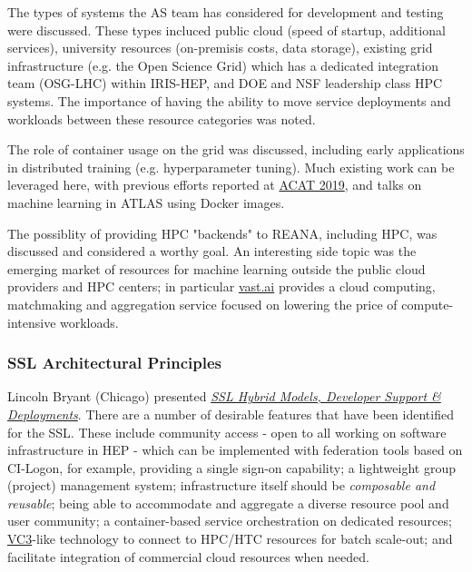 \documentclass[11pt,letterpaper,fleqn]{article}
\begin{document}
The types of systems the AS team has considered for development and testing were discussed. These types incluced public cloud (speed of startup, additional services), university resources (on-premisis costs, data storage), existing grid infrastructure (e.g. the Open Science Grid) which has a dedicated integration team (OSG-LHC) within IRIS-HEP, and DOE and NSF leadership class HPC systems. The importance of having the ability to move service deployments and workloads between these resource categories was noted.

The role of container usage on the grid was discussed, including early applications in distributed training (e.g. hyperparameter tuning).  Much existing work can be leveraged here, with previous efforts reported at \href{https://indico.cern.ch/event/708041/}{ACAT 2019}, and talks on machine learning in ATLAS using Docker images.

The possiblity of providing HPC "backends" to REANA, including HPC, was discussed and considered a worthy goal. An interesting side topic was the emerging market of resources for machine learning outside the public cloud providers and HPC centers; in particular \href{Vast.ai}{vast.ai} provides a cloud computing, matchmaking and aggregation service focused on lowering the price of compute-intensive workloads.

\subsubsection{SSL Architectural Principles}
\vspace{0.2cm}
Lincoln Bryant (Chicago) presented \href{https://indico.cern.ch/event/820946/contributions/3461592/attachments/1866998/3119402/2019.06.21_SSL_Patterns__Deployments_Lincoln.pdf}{\textit{SSL Hybrid Models, Developer Support \& Deployments}}. There are a number of desirable features that have been identified for the SSL.  These include community access - open to all working on software infrastructure in HEP - which can be implemented with federation tools based on {\sf CI-Logon}, for example, providing a single sign-on capability; a lightweight group (project) management system; infrastructure itself should be \textit{composable and reusable}; being able to accommodate and aggregate a diverse resource pool and user community; a container-based service orchestration on dedicated resources; \href{http://www.virtualclusters.org/}{VC3}-like technology to connect to HPC/HTC resources for batch scale-out; and facilitate integration of commercial cloud resources when needed.
\end{document}
